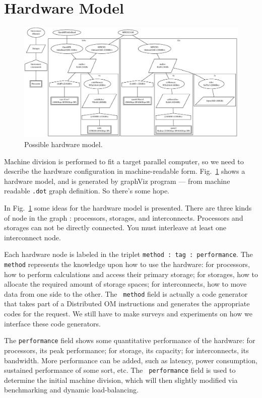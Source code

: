 \documentclass[twocolumn]{article}
\begin{document}
\section{Hardware Model}


\begin{figure}
  \begin{center}
    \includegraphics[scale=0.3]{figure/hardware_graph.eps}
  \end{center}
  \caption{Possible hardware model.}\label{FigureHardware}
\end{figure}

Machine division is performed to fit a target parallel computer, so we
need to describe the hardware configuration in machine-readable form.
Fig.~\ref{FigureHardware} shows a hardware model, and is generated by
graphViz program --- from machine readable {\tt .dot} graph
definition. So there's some hope. 

In Fig.~\ref{FigureHardware} some ideas for the hardware model is
presented. There are three kinds of node in the graph : processors, storages,
and interconnects. Processors and storages can not be directly connected. You
must interleave at least one interconnect node.

Each hardware node is labeled in the triplet {\tt method : tag :
  performance}. The {\tt method} represents the knowledge upon how to use the
hardware: for processors, how to perform calculations and access their primary
storage; for storages, how to allocate the required amount of storage spaces;
for interconnects, how to move data from one side to the other. The {\tt
  method} field is actually a code generator that takes part of a Distributed
OM instructions and generates the appropriate codes for the request. We still
have to make surveys and experiments on how we interface these code
generators.

The {\tt performance} field shows some quantitative performance of the
hardware: for processors, its peak performance; for storage, its capacity; for
interconnects, its bandwidth. More performance can be added, such as latency,
power consumption, sustained performance of some sort, etc. The {\tt
  performance} field is used to determine the initial machine division, which
will then slightly modified via benchmarking and dynamic load-balancing.
\end{document}
